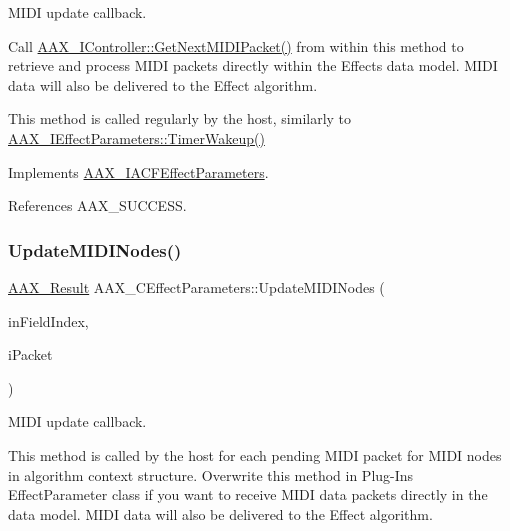 M\+I\+DI update callback. 

Call \mbox{\hyperlink{a01789_a2896ba3a1ed86ce2813b1736d316d275}{A\+A\+X\+\_\+\+I\+Controller\+::\+Get\+Next\+M\+I\+D\+I\+Packet()}} from within this method to retrieve and process M\+I\+DI packets directly within the Effect\textquotesingle{}s data model. M\+I\+DI data will also be delivered to the Effect algorithm.

This method is called regularly by the host, similarly to \mbox{\hyperlink{a01669_ab5b8da9e1a9d778d327ac04f4ab8d139}{A\+A\+X\+\_\+\+I\+Effect\+Parameters\+::\+Timer\+Wakeup()}} 

Implements \mbox{\hyperlink{a01669_af376aef3d3ecdc6287f820b4e01f5c9b}{A\+A\+X\+\_\+\+I\+A\+C\+F\+Effect\+Parameters}}.



References A\+A\+X\+\_\+\+S\+U\+C\+C\+E\+SS.

\mbox{\label{a01481_aac6fa72278c0f46aa430cd79bdb2d767}} 
\subsubsection{\texorpdfstring{UpdateMIDINodes()}{UpdateMIDINodes()}}
{\footnotesize\ttfamily \mbox{\hyperlink{a00392_a4d8f69a697df7f70c3a8e9b8ee130d2f}{A\+A\+X\+\_\+\+Result}} A\+A\+X\+\_\+\+C\+Effect\+Parameters\+::\+Update\+M\+I\+D\+I\+Nodes (\begin{DoxyParamCaption}\item[{\mbox{\hyperlink{a00392_ae807f8986143820cfb5d6da32165c9c7}{A\+A\+X\+\_\+\+C\+Field\+Index}}}]{in\+Field\+Index,  }\item[{\mbox{\hyperlink{a01429}{A\+A\+X\+\_\+\+C\+Midi\+Packet}} \&}]{i\+Packet }\end{DoxyParamCaption})\hspace{0.3cm}{\ttfamily [virtual]}}



M\+I\+DI update callback. 

This method is called by the host for each pending M\+I\+DI packet for M\+I\+DI nodes in algorithm context structure. Overwrite this method in Plug-\/\+In\textquotesingle{}s Effect\+Parameter class if you want to receive M\+I\+DI data packets directly in the data model. M\+I\+DI data will also be delivered to the Effect algorithm.

